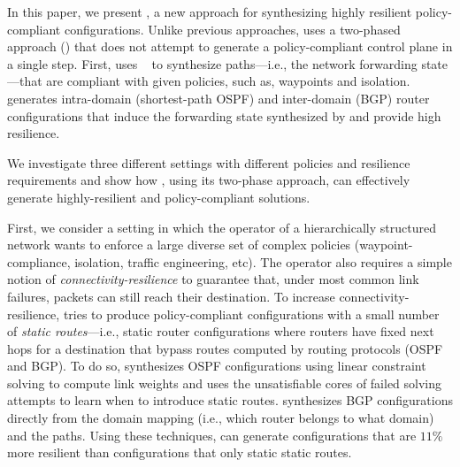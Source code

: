 In this paper, we present \name, a new approach for synthesizing
highly resilient policy-compliant configurations.
Unlike previous approaches, \name uses a two-phased approach 
() 
that does not attempt to generate 
a policy-compliant control plane in a single step.
First, \name 
uses \genesis~\cite{genesis}
to synthesize paths---i.e., the network forwarding state---that are compliant
with given policies, such as, waypoints and isolation.
\name generates 
intra-domain (shortest-path OSPF) and inter-domain (BGP) router configurations
that induce the forwarding
state synthesized by \genesis and provide high resilience. 

We investigate three different settings with different policies and
resilience requirements and show how \name, using its two-phase
approach, can effectively generate highly-resilient and
policy-compliant solutions.

First, we consider a setting in which the operator of a hierarchically
structured network wants to enforce a large diverse set of complex
policies (waypoint-compliance, isolation, traffic engineering, etc).
The operator also requires a simple notion of
\emph{connectivity-resilience} to guarantee that, under most common
link failures, packets can still reach their destination.
To increase connectivity-resilience, \name tries to produce
policy-compliant configurations with a small number of {\em static
  routes}---i.e., static router configurations where routers have
fixed next hops for a destination that bypass routes computed by routing protocols (OSPF and BGP).
To do so, \name synthesizes OSPF configurations using linear constraint solving to compute
link weights and uses the unsatisfiable cores
of failed solving attempts to learn when to introduce static routes.
\name synthesizes BGP configurations directly from the domain mapping (i.e., which router belongs to what domain) and the paths.
Using these techniques, \name can generate configurations that are
$11\%$ more resilient than configurations that only static static routes.


